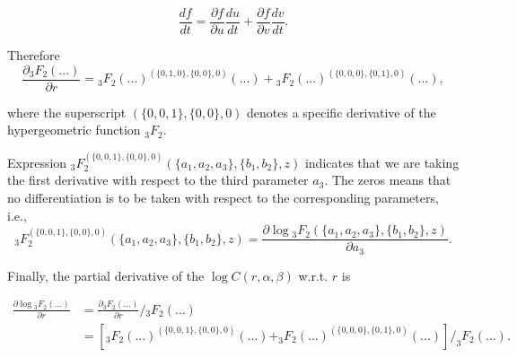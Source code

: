 \documentclass[11pt]{article}
\begin{document}
\begin{equation}
	\frac{df}{dt} = \frac{\partial f}{\partial u} \frac{du}{dt} + \frac{\partial f}{\partial v} \frac{dv}{dt}.
\end{equation}

Therefore
\begin{equation}
	\frac{\partial {}_3F_2(...)}{\partial r} = {}_3F_2(...)^{(\{0,1,0\},\{0,0\},0)}(...) + {}_3F_2(...)^{(\{0,0,0\},\{0,1\},0)}(...),
\end{equation}

where the superscript \( (\{0,0,1\},\{0,0\},0) \) denotes a specific derivative of the  hypergeometric function \( {}_3F_2 \). 

Expression \( {}_3F_2^{(\{0,0,1\},\{0,0\},0)}(\{a_1,a_2,a_3\},\{b_1,b_2\},z) \) indicates that we are taking the first derivative with respect to the third parameter \( a_3 \). The zeros means that no differentiation is to be taken with respect to the corresponding parameters, i.e.,
\begin{equation}
	{}_3F_2^{(\{0,0,1\},\{0,0\},0)}(\{a_1,a_2,a_3\},\{b_1,b_2\},z) = \frac{\partial \log {}_3F_2(\{a_1,a_2,a_3\},\{b_1,b_2\},z)}{\partial a_3}.
\end{equation}

Finally, the partial derivative of the $\log C(r,\alpha,\beta)$ w.r.t. $r$ is

\begin{equation}
\begin{aligned}
	\frac{\partial \log {}_3F_2(...)}{\partial r} &=  \frac{\partial {}_3F_2(...)}{\partial r} /  {}_3F_2(...) \\
	&= \left[ _3F_2(...)^{(\{0,0,1\},\{0,0\},0)}(...) + _3F_2(...)^{(\{0,0,0\},\{0,1\},0)}(...) \right]  / _3F_2(...).
\end{aligned}
\end{equation}
\end{document}
